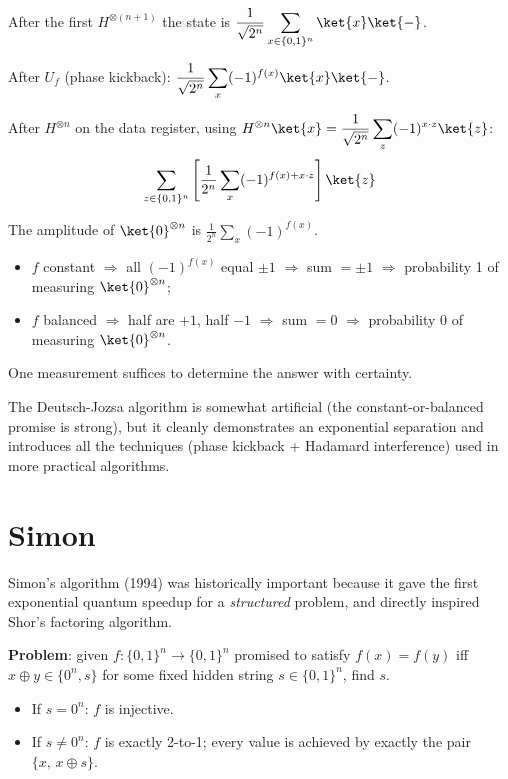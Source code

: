 \documentclass[oneside]{academica}
\begin{document}
After the first $H^{\otimes(n+1)}$ the state is $\displaystyle \frac{1}{\sqrt{2^n}}\sum_{x\in\{0,1\}^n}\ket{x}\ket{-}$.

After $U_f$ (phase kickback): $\displaystyle \frac{1}{\sqrt{2^n}}\sum_x(-1)^{f(x)}\ket{x}\ket{-}$.

After $H^{\otimes n}$ on the data register, using $\displaystyle H^{\otimes n}\ket{x}=\frac{1}{\sqrt{2^n}}\sum_z(-1)^{x\cdot z}\ket{z}$:
\begin{equation*}
  \sum_{z\in\{0,1\}^n}\left[\frac{1}{2^n}\sum_{x}(-1)^{f(x)+x\cdot z}\right]\ket{z}
\end{equation*}

The amplitude of $\ket{0}^{\otimes n}$ is $\displaystyle \frac{1}{2^n}\sum_x(-1)^{f(x)}$.
\begin{itemize}
  \item $f$ constant $\Rightarrow$ all $(-1)^{f(x)}$ equal $\pm1$ $\Rightarrow$ sum $=\pm1$ $\Rightarrow$ probability 1 of measuring $\ket{0}^{\otimes n}$;
  \item $f$ balanced $\Rightarrow$ half are $+1$, half $-1$ $\Rightarrow$ sum $=0$ $\Rightarrow$ probability 0 of measuring $\ket{0}^{\otimes n}$.
\end{itemize}

One measurement suffices to determine the answer with certainty.

\begin{note}
  The Deutsch-Jozsa algorithm is somewhat artificial (the constant-or-balanced promise is strong), but it cleanly demonstrates an exponential separation and introduces all the techniques (phase kickback + Hadamard interference) used in more practical algorithms.
\end{note}

\section{Simon}

Simon's algorithm (1994) was historically important because it gave the first exponential quantum speedup for a \emph{structured} problem, and directly inspired Shor's factoring algorithm.

\textbf{Problem}: given $f:\{0,1\}^n\to\{0,1\}^n$ promised to satisfy $f(x)=f(y)$ iff $x\oplus y\in\{0^n,s\}$ for some fixed hidden string $s\in\{0,1\}^n$, find $s$.

\begin{itemize}
  \item If $s=0^n$: $f$ is injective.
  \item If $s\neq0^n$: $f$ is exactly 2-to-1; every value is achieved by exactly the pair $\{x,\,x\oplus s\}$.
\end{itemize}
\end{document}
